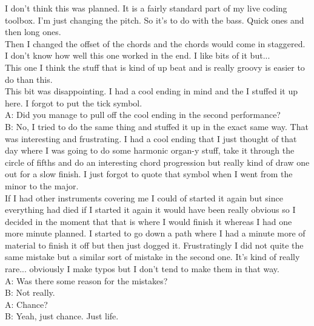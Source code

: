 I don't think this was planned. It is a fairly standard part of my live coding toolbox. I'm just changing the pitch. So it's to do with the bass. Quick ones and then long ones.\\

Then I changed the offset of the chords and the chords would come in staggered. I don't know how well this one worked in the end. I like bits of it but...\\

This one I think the stuff that is kind of up beat and is really groovy is easier to do than this.\\

This bit was disappointing. I had a cool ending in mind and the I stuffed it up here. I forgot to put the tick symbol.\\

A: Did you manage to pull off the cool ending in the second performance?\\

B: No, I tried to do the same thing and stuffed it up in the exact same way. That was interesting and frustrating. I had a cool ending that I just thought of that day where I was going to do some harmonic organ-y stuff, take it through the circle of fifths and do an interesting chord progression but really kind of draw one out for a slow finish. I just forgot to quote that symbol when I went from the minor to the major.\\

If I had other instruments covering me I could of started it again but since everything had died if I started it again it would have been really obvious so I decided in the moment that that is where I would finish it whereas I had one more minute planned. I started to go down a path where I had a minute more of material to finish it off but then just dogged it. Frustratingly I did not quite the same mistake but a similar sort of mistake in the second one. It's kind of really rare... obviously I make typos but I don't tend to make them in that way.\\

A: Was there some reason for the mistakes?\\

B: Not really.\\

A: Chance?\\

B: Yeah, just chance. Just life.\\

